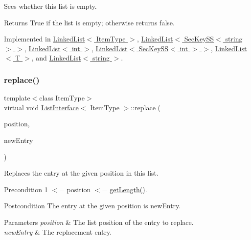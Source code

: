 Sees whether this list is empty. \begin{DoxyReturn}{Returns}
True if the list is empty; otherwise returns false. 
\end{DoxyReturn}


Implemented in \hyperlink{classLinkedList_a008e916c3d51d28b4cc9c8cdf3e9d921}{Linked\+List$<$ Item\+Type $>$}, \hyperlink{classLinkedList_a008e916c3d51d28b4cc9c8cdf3e9d921}{Linked\+List$<$ Sec\+Key\+S\+S$<$ string $>$ $>$}, \hyperlink{classLinkedList_a008e916c3d51d28b4cc9c8cdf3e9d921}{Linked\+List$<$ int $>$}, \hyperlink{classLinkedList_a008e916c3d51d28b4cc9c8cdf3e9d921}{Linked\+List$<$ Sec\+Key\+S\+S$<$ int $>$ $>$}, \hyperlink{classLinkedList_a008e916c3d51d28b4cc9c8cdf3e9d921}{Linked\+List$<$ T $>$}, and \hyperlink{classLinkedList_a008e916c3d51d28b4cc9c8cdf3e9d921}{Linked\+List$<$ string $>$}.

\mbox{\label{classListInterface_aae877a56b7b9f5f526c37a00e234fad1}} 
\subsubsection{\texorpdfstring{replace()}{replace()}}
{\footnotesize\ttfamily template$<$class Item\+Type$>$ \\
virtual void \hyperlink{classListInterface}{List\+Interface}$<$ Item\+Type $>$\+::replace (\begin{DoxyParamCaption}\item[{int}]{position,  }\item[{const Item\+Type \&}]{new\+Entry }\end{DoxyParamCaption})\hspace{0.3cm}{\ttfamily [pure virtual]}}

Replaces the entry at the given position in this list. \begin{DoxyPrecond}{Precondition}
1 $<$= position $<$= \hyperlink{classListInterface_afc85695d4137f1e29ff02e179c9f3221}{get\+Length()}. 
\end{DoxyPrecond}
\begin{DoxyPostcond}{Postcondition}
The entry at the given position is new\+Entry. 
\end{DoxyPostcond}

\begin{DoxyParams}{Parameters}
{\em position} & The list position of the entry to replace. \\
\hline
{\em new\+Entry} & The replacement entry. \\
\hline
\end{DoxyParams}


